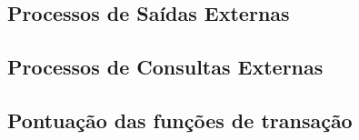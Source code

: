     
  
  \subsection{Processos de Saídas Externas}
    
    

    
\vfill
\pagebreak
  \subsection{Processos de Consultas Externas}
    
    
    
    
\vfill
\pagebreak
  \subsection{Pontuação das funções de transação}
    
